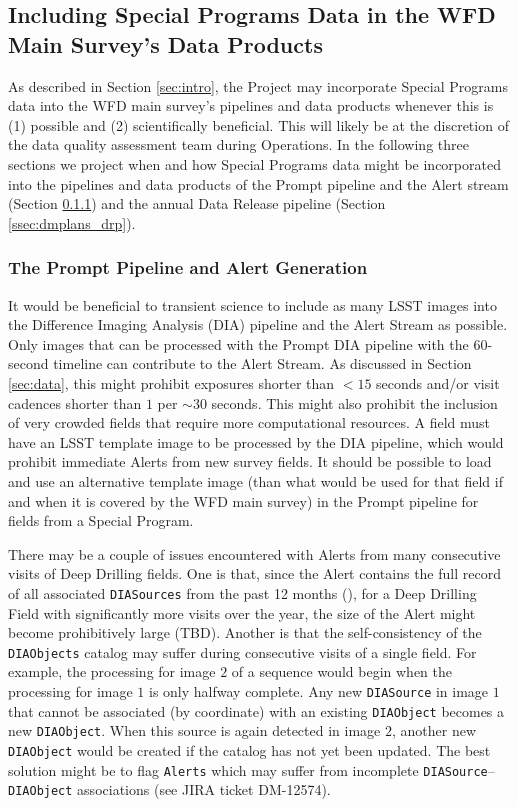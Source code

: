 \documentclass[DM,lsstdoc,toc]{lsstdoc}
\begin{document}
\subsection{Including Special Programs Data in the WFD Main Survey's Data Products}\label{ssec:dmplans_WFD}

As described in Section \ref{sec:intro}, the Project may incorporate Special Programs data into the WFD main survey's pipelines and data products whenever this is (1) possible and (2) scientifically beneficial. This will likely be at the discretion of the data quality assessment team during Operations. In the following three sections we project when and how Special Programs data might be incorporated into the pipelines and data products of the Prompt pipeline and the Alert stream (Section \ref{ssec:dmplans_prompt}) and the annual Data Release pipeline (Section \ref{ssec:dmplans_drp}).

\subsubsection{The Prompt Pipeline and Alert Generation}\label{ssec:dmplans_prompt}

It would be beneficial to transient science to include as many LSST images into the Difference Imaging Analysis (DIA) pipeline and the Alert Stream as possible. Only images that can be processed with the Prompt DIA pipeline with the $60$-second timeline can contribute to the Alert Stream. As discussed in Section \ref{sec:data}, this might prohibit exposures shorter than $<15$ seconds and/or visit cadences shorter than $1$ per $\sim30$ seconds. This might also prohibit the inclusion of very crowded fields that require more computational resources. A field must have an LSST template image to be processed by the DIA pipeline, which would prohibit immediate Alerts from new survey fields. It should be possible to load and use an alternative template image (than what would be used for that field if and when it is covered by the WFD main survey) in the Prompt pipeline for fields from a Special Program. 

There may be a couple of issues encountered with Alerts from many consecutive visits of Deep Drilling fields. One is that, since the Alert contains the full record of all associated {\tt DIASources} from the past 12 months (), for a Deep Drilling Field with significantly more visits over the year, the size of the Alert might become prohibitively large (TBD). Another is that the self-consistency of the \texttt{DIAObjects} catalog may suffer during consecutive visits of a single field. For example, the processing for image $2$ of a sequence would begin when the processing for image $1$ is only halfway complete. Any new {\tt DIASource} in image $1$ that cannot be associated (by coordinate) with an existing {\tt DIAObject} becomes a new {\tt DIAObject}. When this source is again detected in image $2$, another new {\tt DIAObject} would be created if the catalog has not yet been updated. The best solution might be to flag {\tt Alerts} which may suffer from incomplete {\tt DIASource}--{\tt DIAObject} associations (see JIRA ticket DM-12574). 
\end{document}
